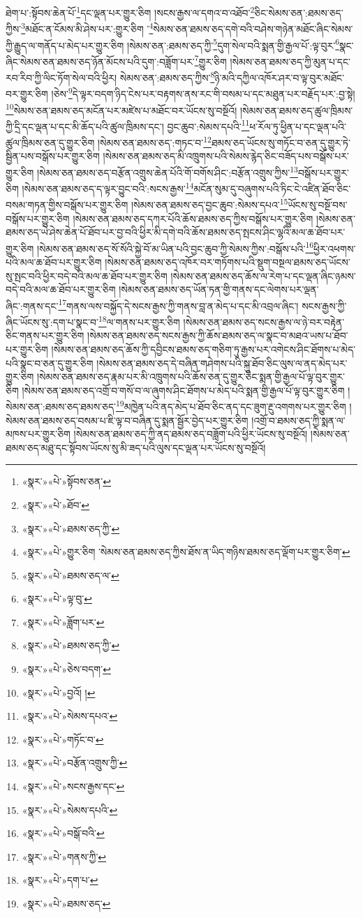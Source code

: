 ཐེག་པ་:སྟོབས་ཆེན་པོ་\footnote{«སྣར་»«པེ་»སྟོབས་ཅན་}དང་ལྡན་པར་གྱུར་ཅིག །སངས་རྒྱས་ལ་དགའ་བ་འཐོབ་\footnote{«སྣར་»«པེ་»ཐོབ་}ཅིང་སེམས་ཅན་:ཐམས་ཅད་ཀྱིས་\footnote{«སྣར་»«པེ་»ཐམས་ཅད་ཀྱི་}མཐོང་ན་ངོམས་མི་ཤེས་པར་:གྱུར་ཅིག ་\footnote{«སྣར་»«པེ་»གྱུར་ཅིག ་སེམས་ཅན་ཐམས་ཅད་ཀྱིས་ཐོས་ན་ཡིད་གཉིས་ཐམས་ཅད་ལྡོག་པར་གྱུར་ཅིག་}སེམས་ཅན་ཐམས་ཅད་དགེ་བའི་བཤེས་གཉེན་མཐོང་ཞིང་སེམས་ཀྱི་རྒྱུད་ལ་གནོད་པ་མེད་པར་གྱུར་ཅིག །སེམས་ཅན་:ཐམས་ཅད་ཀྱི་\footnote{«སྣར་»«པེ་»ཐམས་ཅད་ལ་}དུག་སེལ་བའི་སྨན་གྱི་རྒྱལ་པོ་:ལྟ་བུར་\footnote{«སྣར་»«པེ་»ལྟ་བུ་}སྣང་ཞིང་སེམས་ཅན་ཐམས་ཅད་ཉོན་མོངས་པའི་དུག་:བཟློག་པར་\footnote{«སྣར་»«པེ་»ཟློག་པར་}གྱུར་ཅིག །སེམས་ཅན་ཐམས་ཅད་ཀྱི་མུན་པ་དང་རབ་རིབ་ཀྱི་ལིང་ཏོག་སེལ་བའི་ཕྱིར། སེམས་ཅན་:ཐམས་ཅད་ཀྱིས་\footnote{«སྣར་»«པེ་»ཐམས་ཅད་ཀྱི་}ཉི་མའི་དཀྱིལ་འཁོར་ཤར་བ་ལྟ་བུར་མཐོང་བར་གྱུར་ཅིག །ཅེས་\footnote{«སྣར་»«པེ་»ཅེས་བདག་}དེ་ལྟར་བདག་ཉིད་ངེས་པར་བརྟགས་ནས་རང་གི་བསམ་པ་དང་མཐུན་པར་བརྗོད་པར་:བྱ་སྟེ། \footnote{«སྣར་»«པེ་»བྱའོ། ། }སེམས་ཅན་ཐམས་ཅད་མངོན་པར་མཛེས་པ་མཐོང་བར་ཡོངས་སུ་བསྔོའོ། །སེམས་ཅན་ཐམས་ཅད་ཚུལ་ཁྲིམས་ཀྱི་དྲི་དང་ལྡན་པ་དང་མི་ཆོད་པའི་ཚུལ་ཁྲིམས་དང་། བྱང་ཆུབ་:སེམས་དཔའི་\footnote{«སྣར་»«པེ་»སེམས་དཔའ་}ཕ་རོལ་ཏུ་ཕྱིན་པ་དང་ལྡན་པའི་ཚུལ་ཁྲིམས་ཅན་དུ་གྱུར་ཅིག །སེམས་ཅན་ཐམས་ཅད་:གཏང་བ་\footnote{«སྣར་»«པེ་»གཏོང་བ་}ཐམས་ཅད་ཡོངས་སུ་གཏོང་བ་ཅན་དུ་གྱུར་ཏེ་སྦྱིན་པས་བསྒོས་པར་གྱུར་ཅིག །སེམས་ཅན་ཐམས་ཅད་མི་འཁྲུགས་པའི་སེམས་རྙེད་ཅིང་བཟོད་པས་བསྒོས་པར་གྱུར་ཅིག །སེམས་ཅན་ཐམས་ཅད་བརྩོན་འགྲུས་ཆེན་པོའི་གོ་བགོས་ཤིང་:བརྩོན་འགྲུས་ཀྱིས་\footnote{«སྣར་»«པེ་»བརྩོན་འགྲུས་ཀྱི་}བསྒོས་པར་གྱུར་ཅིག །སེམས་ཅན་ཐམས་ཅད་ད་ལྟར་བྱུང་བའི་:སངས་རྒྱས་\footnote{«སྣར་»«པེ་»སངས་རྒྱས་དང་}མངོན་སུམ་དུ་བཞུགས་པའི་ཏིང་ངེ་འཛིན་ཐོབ་ཅིང་བསམ་གཏན་གྱིས་བསྒོས་པར་གྱུར་ཅིག །སེམས་ཅན་ཐམས་ཅད་བྱང་ཆུབ་:སེམས་དཔའ་\footnote{«སྣར་»«པེ་»སེམས་དཔའི་}ཡོངས་སུ་བསྔོ་བས་བསྒོས་པར་གྱུར་ཅིག །སེམས་ཅན་ཐམས་ཅད་དཀར་པོའི་ཆོས་ཐམས་ཅད་ཀྱིས་བསྒོས་པར་གྱུར་ཅིག །སེམས་ཅན་ཐམས་ཅད་ཡེ་ཤེས་ཆེན་པོ་ཐོབ་པར་བྱ་བའི་ཕྱིར་མི་དགེ་བའི་ཆོས་ཐམས་ཅད་སྤངས་ཤིང་ལྷའི་མལ་ཆ་ཐོབ་པར་གྱུར་ཅིག །སེམས་ཅན་ཐམས་ཅད་སོ་སོའི་སྐྱེ་བོ་མ་ཡིན་པའི་བྱང་ཆུབ་ཀྱི་སེམས་ཀྱིས་:བསྒོས་པའི་\footnote{«སྣར་»«པེ་»བསྒོ་བའི་}ཕྱིར་འཕགས་པའི་མལ་ཆ་ཐོབ་པར་གྱུར་ཅིག །སེམས་ཅན་ཐམས་ཅད་འཁོར་བར་གཏོགས་པའི་སྡུག་བསྔལ་ཐམས་ཅད་ཡོངས་སུ་སྤང་བའི་ཕྱིར་བདེ་བའི་མལ་ཆ་ཐོབ་པར་གྱུར་ཅིག །སེམས་ཅན་ཐམས་ཅད་ཆོས་ལ་རེག་པ་དང་ལྡན་ཞིང་ཉམས་བདེ་བའི་མལ་ཆ་ཐོབ་པར་གྱུར་ཅིག །སེམས་ཅན་ཐམས་ཅད་ཡོན་ཏན་གྱི་གནས་དང་ལེགས་པར་ལྡན་ཞིང་:གནས་དང་\footnote{«སྣར་»«པེ་»གནས་ཀྱི་}གནས་ལས་བསྐྱོད་དེ་སངས་རྒྱས་ཀྱི་གནས་བླ་ན་མེད་པ་དང་མི་འབྲལ་ཞིང་། སངས་རྒྱས་ཀྱི་ཞིང་ཡོངས་སུ་:དག་པ་སྣང་བ་\footnote{«སྣར་»«པེ་»དག་པ་}ལ་གནས་པར་གྱུར་ཅིག །སེམས་ཅན་ཐམས་ཅད་སངས་རྒྱས་ལ་ཉེ་བར་བརྟེན་ཅིང་གནས་པར་གྱུར་ཅིག །སེམས་ཅན་ཐམས་ཅད་སངས་རྒྱས་ཀྱི་ཆོས་ཐམས་ཅད་ལ་སྣང་བ་མཐའ་ཡས་པ་ཐོབ་པར་གྱུར་ཅིག །སེམས་ཅན་ཐམས་ཅད་ཆོས་ཀྱི་དབྱིངས་ཐམས་ཅད་གཅིག་ཏུ་རྒྱས་པར་འགེངས་ཤིང་ཐོགས་པ་མེད་པའི་སྣང་བ་ཅན་དུ་གྱུར་ཅིག །སེམས་ཅན་ཐམས་ཅད་དེ་བཞིན་གཤེགས་པའི་སྐུ་ཐོབ་ཅིང་ལུས་ལ་ནད་མེད་པར་གྱུར་ཅིག །སེམས་ཅན་ཐམས་ཅད་རྣམ་པར་མི་འཁྲུགས་པའི་ཆོས་ཅན་དུ་གྱུར་ཅིང་སྨན་གྱི་རྒྱལ་པོ་ལྟ་བུར་གྱུར་ཅིག །སེམས་ཅན་ཐམས་ཅད་འགྲོ་བ་གསོ་བ་ལ་ཞུགས་ཤིང་ཐོགས་པ་མེད་པའི་སྨན་གྱི་རྒྱལ་པོ་ལྟ་བུར་གྱུར་ཅིག །སེམས་ཅན་:ཐམས་ཅད་ཐམས་ཅད་\footnote{«སྣར་»«པེ་»ཐམས་ཅད་}མཁྱེན་པའི་ནད་མེད་པ་ཐོབ་ཅིང་ནད་དང་ཟུག་རྔུ་འགགས་པར་གྱུར་ཅིག །སེམས་ཅན་ཐམས་ཅད་བསམ་པ་ཇི་ལྟ་བ་བཞིན་དུ་སྨན་སྦྱོར་བྱེད་པར་གྱུར་ཅིག །འགྲོ་བ་ཐམས་ཅད་ཀྱི་སྨན་ལ་མཁས་པར་གྱུར་ཅིག །སེམས་ཅན་ཐམས་ཅད་ཀྱི་ནད་ཐམས་ཅད་བཟློག་པའི་ཕྱིར་ཡོངས་སུ་བསྔོའོ། །སེམས་ཅན་ཐམས་ཅད་མཐུ་དང་སྟོབས་ཡོངས་སུ་མི་ཟད་པའི་ལུས་དང་ལྡན་པར་ཡོངས་སུ་བསྔོའོ། 
